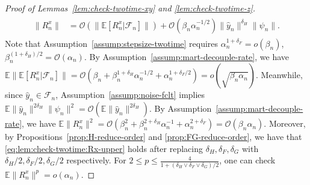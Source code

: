 \documentclass[11pt]{article}
\theoremstyle{plain}
\theoremstyle{definition}
\def\Hsmooth{{\delta_H}}
\def\Fsmooth{{\delta_F}}
\def\Gsmooth{{\delta_G}}
\def\FM{{\mathcal F}}
\def\OM{{\mathcal O}}
\def\EB{{\mathbb E}}
\newcommand{\yhat}{{\hat{y}}}
\begin{document}
\begin{appendix}
\begin{proof}[Proof of Lemmas~\ref{lem:check-twotime-xy} and \ref{lem:check-twotime-z}]
\begin{align}
\begin{split}
        \| R_{n}^x \| 
        & = \OM( \| \EB [ R_{n}^x | \FM_n ] \| ) + \OM (\beta_{n} \alpha_{n}^{-1/2}) \| \yhat_{n} \|^\Hsmooth \| \psi_{n} \|.
    \end{split}
\end{align}
Note that Assumption~\ref{assump:stepsize-twotime} requires $\alpha_{n}^{1+\Fsmooth} = o (\beta_{n})$, $\beta_{n}^{(1+\Hsmooth) / 2 } = \OM(\alpha_{n})$.
By Assumption~\ref{assump:mart-decouple-rate}, we have
$ \EB \|  \EB [ R_{n}^x | \FM_n ] \| = \OM( \beta_{n} + \beta_{n}^{1+\Hsmooth} \alpha_{n}^{-1/2} + \alpha_{n}^{1 + \Fsmooth/2}) = o(\sqrt{\beta_{n} \alpha_{n}}) $.
Meanwhile, since $\yhat_{n} \in \FM_{n}$, Assumption~\ref{assump:noise-fclt} implies $\EB \| \yhat_{n} \|^{2\Hsmooth} \| \psi_{n} \|^2 = \OM( \EB \| \yhat_{n} \|^{2\Hsmooth})$.
By Assumption~\ref{assump:mart-decouple-rate}, we have
$ \EB \| R_{n}^x \|^2 = \OM( \beta_{n}^2 + \beta_{n}^{2+\Hsmooth} \alpha_{n}^{-1} + \alpha_{n}^{2 + \Fsmooth}) = \OM(\beta_n \alpha_n) $.
Moreover, by Propositions~\ref{prop:H-reduce-order} and \ref{prop:FG-reduce-order}, we have that \eqref{eq:lem:check-twotime:Rx-upper} holds after replacing $\Hsmooth, \Fsmooth, \Gsmooth$ with $\Hsmooth/2, \Fsmooth/2, \Gsmooth/2$ respectively.
For $2 \le p \le \frac{4}{1 + (\Hsmooth \vee \Fsmooth \vee \Gsmooth) / 2 }$, one can check $\EB \| R_{n}^x \|^p = o(\alpha_{n}) $.
\vspace{0.2cm}


\end{proof}
\end{appendix}
\end{document}
